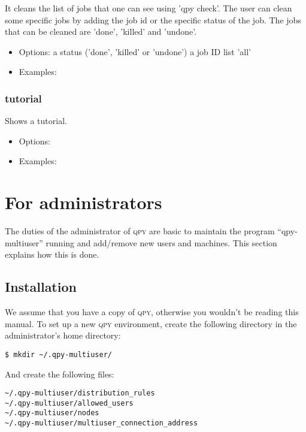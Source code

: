 \documentclass[a4paper,12pt]{article}
\newcommand{\qpy}{\textsc{qpy}}
\begin{document}
It cleans the list of jobs that one can see using 'qpy check'.
The user can clean some specific jobs by adding the job id or the specific status of the job.
The jobs that can be cleaned are 'done', 'killed' and 'undone'. 


\begin{itemize}

\item Options:
  a status ('done', 'killed' or 'undone')
  a job ID list
  'all'  

\item Examples:

\end{itemize}

\subsubsection{tutorial}

Shows a tutorial.

\begin{itemize}
\item Options:

\item Examples:

\end{itemize}



\newpage
\section{For administrators}

The duties of the administrator of \qpy{} are basic to maintain the program ``qpy-multiuser'' running and add/remove new users and machines.
This section explains how this is done.

\subsection{Installation}\label{sec:instal_admin}

We assume that you have a copy of \qpy{}, otherwise you wouldn't be reading this manual.
To set up a new \qpy{} environment, create the following directory in the administrator's home directory:

\begin{lstlisting}[style=BashStyle]
$ mkdir ~/.qpy-multiuser/
\end{lstlisting}
And create the following files:

\begin{verbatim}
~/.qpy-multiuser/distribution_rules
~/.qpy-multiuser/allowed_users
~/.qpy-multiuser/nodes
~/.qpy-multiuser/multiuser_connection_address
\end{verbatim}
\end{document}
